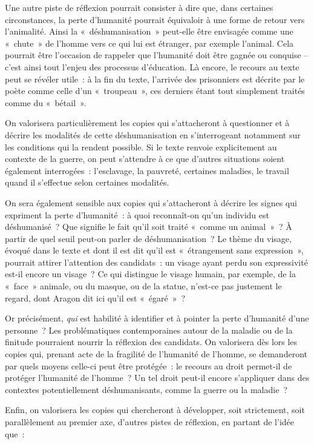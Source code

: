 {Une autre piste de réflexion pourrait consister à dire que, dans certaines circonstances,
la perte d'humanité pourrait équivaloir à une forme de retour vers l'animalité. Ainsi la
«~déshumanisation~» peut-elle être envisagée comme une «~chute~» de l'homme vers
ce qui lui est étranger, par exemple l'animal. Cela pourrait être l'occasion de rappeler
que l'humanité doit être gagnée ou conquise – c'est ainsi tout l'enjeu des processus
d'éducation. Là encore, le recours au texte peut se révéler utile~: à la fin du texte,
l'arrivée des prisonniers est décrite par le poète comme celle d'un «~troupeau~», ces
derniers étant tout simplement traités comme du «~bétail~».

On valorisera particulièrement les copies qui s'attacheront à questionner et à décrire
les modalités de cette déshumanisation en s'interrogeant notamment sur les
conditions qui la rendent possible. Si le texte renvoie explicitement au contexte de la
guerre, on peut s'attendre à ce que d'autres situations soient également interrogées~:
l'esclavage, la pauvreté, certaines maladies, le travail quand il s'effectue selon
certaines modalités.

On sera également sensible aux copies qui s'attacheront à décrire les signes qui
expriment la perte d'humanité~: à quoi reconnaît-on qu'un individu est déshumanisé~?
Que signifie le fait qu'il soit traité «~comme un animal~»~? À partir de quel seuil peut-on
parler de déshumanisation~? Le thème du visage, évoqué dans le texte et dont il est
dit qu'il est «~étrangement sans expression~», pourrait attirer l'attention des candidats~:
un visage ayant perdu son expressivité est-il encore un visage~? Ce qui distingue le
visage humain, par exemple, de la «~face~» animale, ou du masque, ou de la statue,
n'est-ce pas justement le regard, dont Aragon dit ici qu'il est «~égaré~»~?

Or précisément, \textit{qui} est habilité à identifier et à pointer la perte d'humanité d'une
personne~? Les problématiques contemporaines autour de la maladie ou de la finitude
pourraient nourrir la réflexion des candidats. On valorisera dès lors les copies qui,
prenant acte de la fragilité de l'humanité de l'homme, se demanderont par quels
moyens celle-ci peut être protégée~: le recours au droit permet-il de protéger l'humanité
de l'homme~? Un tel droit peut-il encore s'appliquer dans des contextes potentiellement
déshumanisants, comme la guerre ou la maladie~?

Enfin, on valorisera les copies qui chercheront à développer, soit strictement, soit
parallèlement au premier axe, d'autres pistes de réflexion, en partant de l'idée que~:

}
